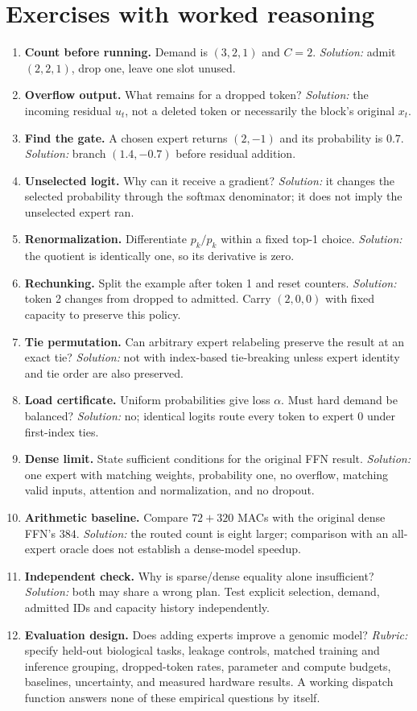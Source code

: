 \section{Exercises with worked reasoning}
\begin{enumerate}
\item \textbf{Count before running.} Demand is $(3,2,1)$ and $C=2$.
\emph{Solution:} admit $(2,2,1)$, drop one, leave one slot unused.
\item \textbf{Overflow output.} What remains for a dropped token?
\emph{Solution:} the incoming residual $u_t$, not a deleted token or necessarily the block's original $x_t$.
\item \textbf{Find the gate.} A chosen expert returns $(2,-1)$ and its probability is $0.7$.
\emph{Solution:} branch $(1.4,-0.7)$ before residual addition.
\item \textbf{Unselected logit.} Why can it receive a gradient?
\emph{Solution:} it changes the selected probability through the softmax denominator; it does not imply the unselected expert ran.
\item \textbf{Renormalization.} Differentiate $p_k/p_k$ within a fixed top-1 choice.
\emph{Solution:} the quotient is identically one, so its derivative is zero.
\item \textbf{Rechunking.} Split the example after token 1 and reset counters.
\emph{Solution:} token 2 changes from dropped to admitted. Carry $(2,0,0)$ with fixed capacity to preserve this policy.
\item \textbf{Tie permutation.} Can arbitrary expert relabeling preserve the result at an exact tie?
\emph{Solution:} not with index-based tie-breaking unless expert identity and tie order are also preserved.
\item \textbf{Load certificate.} Uniform probabilities give loss $\alpha$. Must hard demand be balanced?
\emph{Solution:} no; identical logits route every token to expert 0 under first-index ties.
\item \textbf{Dense limit.} State sufficient conditions for the original FFN result.
\emph{Solution:} one expert with matching weights, probability one, no overflow, matching valid inputs, attention and normalization, and no dropout.
\item \textbf{Arithmetic baseline.} Compare $72+320$ MACs with the original dense FFN's $384$.
\emph{Solution:} the routed count is eight larger; comparison with an all-expert oracle does not establish a dense-model speedup.
\item \textbf{Independent check.} Why is sparse/dense equality alone insufficient?
\emph{Solution:} both may share a wrong plan. Test explicit selection, demand, admitted IDs and capacity history independently.
\item \textbf{Evaluation design.} Does adding experts improve a genomic model?
\emph{Rubric:} specify held-out biological tasks, leakage controls, matched training and inference grouping, dropped-token rates, parameter and compute budgets, baselines, uncertainty, and measured hardware results. A working dispatch function answers none of these empirical questions by itself.
\end{enumerate}

